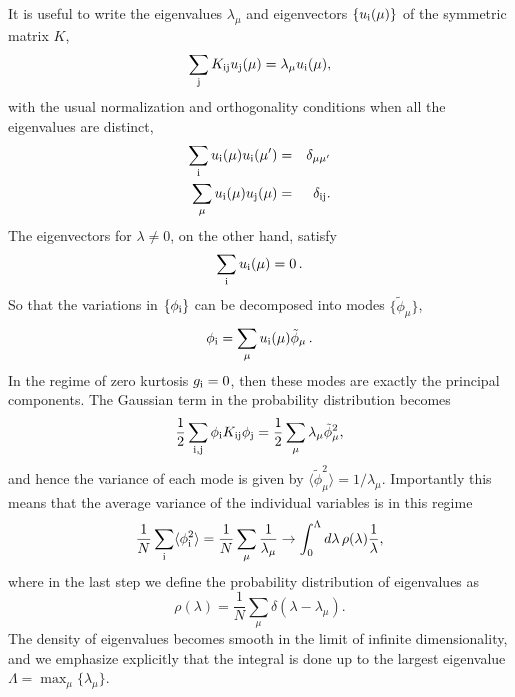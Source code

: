 \documentclass[aps,twocolumn,floats,nofootinbib,prl]{revtex4}
\begin{document}
It is useful to write the eigenvalues $\lambda_\mu$ and eigenvectors $\{u_{\rm i}(\mu )\}$ of the symmetric matrix $K$,
\begin{equation}
\sum_{\rm j} K_{\rm ij} u_{\rm j}(\mu )  = \lambda_\mu u_{\rm i}(\mu ),
\end{equation}
with the usual normalization and orthogonality conditions when all the eigenvalues are distinct,
\begin{eqnarray}
\sum_{\rm i} u_{\rm i}(\mu ) u_{\rm i}(\mu' ) &=&\delta_{\mu\mu'}
\label{normA}\\
\sum_\mu u_{\rm i}(\mu )u_{\rm j}(\mu ) &=& \delta_{\rm ij} .
\end{eqnarray}
The eigenvectors for $\lambda\neq0$, on the other hand, satisfy
\begin{equation}\label{eqn:eigvect}
\sum_{\rm i} u_{\rm i}(\mu ) =0\,.
\end{equation}
So that the variations in $\{\phi_{\rm i}\}$ can be decomposed into modes $\{\tilde\phi_\mu\}$,
\begin{equation}
\phi_{\rm i} = \sum_\mu u_{\rm i} (\mu )\tilde\phi_\mu \,.
\end{equation}
In the regime of zero kurtosis $g_{\rm i} = 0$, then these modes are exactly the principal components.
The Gaussian term in the probability distribution becomes
\begin{equation}
  \frac{1}{2}\sum_{{\rm i},{\rm j}} \phi_{\rm i} K_{\rm ij} \phi_{\rm j}  =   \frac{1}{2}\sum_\mu \lambda_\mu \tilde\phi_\mu^2 ,
  \end{equation}
and hence the variance of each mode is given by $\langle \tilde\phi_\mu^2\rangle = 1/\lambda_\mu$.  Importantly this means that the average variance of the individual variables is in this regime
\begin{equation}
\frac{1}{N}\sum_{\rm i}\langle \phi_{\rm i}^2\rangle = \frac{1}{N}\sum_\mu \frac{1}{\lambda_\mu} \rightarrow \int_0^\Lambda d\lambda\, \rho(\lambda ) \frac{1}{\lambda},
\label{meanvar1}
\end{equation}
where in the last step we define the probability distribution of eigenvalues as
\begin{equation}
\rho (\lambda ) = \frac{1}{N}\sum_\mu \delta (\lambda - \lambda_\mu ).
\end{equation}
The density of eigenvalues becomes smooth in the limit of infinite dimensionality, and we emphasize explicitly that the integral is done up to the largest eigenvalue $\Lambda=\max_\mu \{\lambda_\mu\}$.
\end{document}
